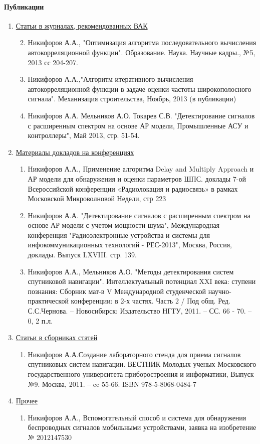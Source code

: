 \paragraph{Публикации}
\begin{enumerate}
	\item {\underline{Статьи в журналах, рекомендованных ВАК}}
	\begin{enumerate}
		\setcounter{enumi}{1}
		\item Никифоров А.А., "Оптимизация алгоритма последовательного вычисления автокорреляционной функции".
			Образование. Наука. Научные кадры., №5, 2013 сс 204-207.
		\item Никифоров А.А.,"Алгоритм итеративного вычисления автокорреляционной функции в задаче оценки частоты широкополосного сигнала".
			Механизация строительства, Ноябрь, 2013 (в публикации)
		\item Никифоров А.А. Мельников А.О. Токарев С.В. "Детектирование сигналов с расширенным спектром на основе АР модели,
			Промышленные АСУ и контроллеры", Май 2013, стр. 51-54.
	\end{enumerate}

	\item {\underline{Материалы докладов на конференциях}}
	\begin{enumerate}
		\item Никифоров А.А., Применение алгоритма Delay and Multiply Approach и АР модели для обнаружения и оценки параметров ШПС. 
			доклады 7-ой Всероссийской конференции «Радиолокация и радиосвязь» в рамках Московской Микроволновой Недели, стр 223 
		\item Никифоров А.А. "Детектирование сигналов с расширенным спектром на основе АР модели с учетом мощности шума", Международная конференция
			"Радиоэлектронные устройства и системы для инфокоммуникационных технологий - РЕС-2013", Москва, Россия, доклады. Выпуск LXVIII. стр. 139.
		\item Никифоров А.А., Мельников А.О. "Методы детектирования систем спутниковой навигации". Интеллектуальный потенциал XXI века:
			ступени познания: Сборник мат-в V Международной студенческой научно-практической конференции: в 2-х частях. Часть 2 / Под общ. Ред.
			С.С.Чернова. – Новосибирск: Издательство НГТУ, 2011. – СС. 66 - 70. – 0, 2 п.л.
	\end{enumerate}

	\item {\underline{Статьи в сборниках статей}}
	\begin{enumerate}
		\item Никифоров А.А.Создание лабораторного стенда для приема сигналов спутниковых систем навигации. ВЕСТНИК Молодых ученых Московского
			государственного университета приборостроения и информатики, Выпуск №9. Москва, 2011. – cc 55-66. ISBN 978-5-8068-0484-7
	\end{enumerate}

	\item {\underline{Прочее}}
	\begin{enumerate}
		\item Никифоров А.А., Вспомогательный способ и система для обнаружения беспроводных сигналов
			мобильными устройствами, заявка на изобретение № 2012147530
	\end{enumerate}
	
\end{enumerate}

